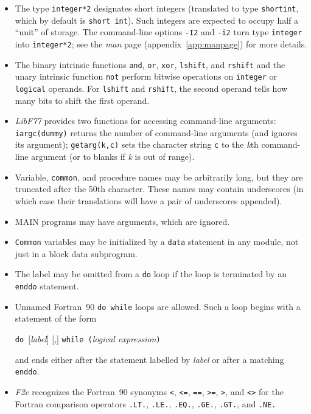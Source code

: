 \documentclass[10pt,a4paper]{article}
\begin{document}
\begin{itemize}
\item The type \verb|integer*2| designates short integers (translated to type \verb|shortint|, which by default is \verb|short int|). Such integers are expected to occupy half a ``unit'' of storage. The command-line options \verb|-I2| and \verb|-i2| turn type \verb|integer| into \verb|integer*2|; see the \emph{man} page (appendix~\ref{app:manpage}) for more details.

\item The binary intrinsic functions \verb|and|, \verb|or|, \verb|xor|, \verb|lshift|, and \verb|rshift| and the unary intrinsic function \verb|not| perform bitwise operations on \verb|integer| or \verb|logical| operands. For \verb|lshift| and \verb|rshift|, the second operand tells how many bits to shift the first operand.

\item \emph{LibF77} provides two functions for accessing command-line arguments: \verb|iargc(dummy)| returns the number of command-line arguments (and ignores its argument); \verb|getarg(k,c)| sets the character string \verb|c| to the \emph{k}th command-line argument (or to blanks if \emph{k} is out of range).

\item Variable, \verb|common|, and procedure names may be arbitrarily long, but they are truncated after the 50th character. These names may contain underscores (in which case their translations will have a pair of underscores appended).

\item MAIN programs may have arguments, which are ignored.

\item \verb|Common| variables may be initialized by a \verb|data| statement in any module, not just in a block data subprogram.

\item The label may be omitted from a \verb|do| loop if the loop is terminated by an \verb|enddo| statement.

\item Unnamed Fortran~90 \verb|do while| loops are allowed. Such a loop begins with a statement of the form
\begin{center}
\verb|do |[\emph{label}] [,] \verb|while (|\emph{logical expression}\verb|)|
\end{center}
and ends either after the statement labelled by \emph{label} or after a matching \verb|enddo|.

\item \emph{F2c} recognizes the Fortran~90 synonyms \verb|<|, \verb|<=|, \verb|==|, \verb|>=|, \verb|>|, and \verb|<>| for the Fortran comparison operators \verb|.LT.|, \verb|.LE.|, \verb|.EQ.|, \verb|.GE.|, \verb|.GT.|, and \verb|.NE.|


\end{itemize}
\end{document}
